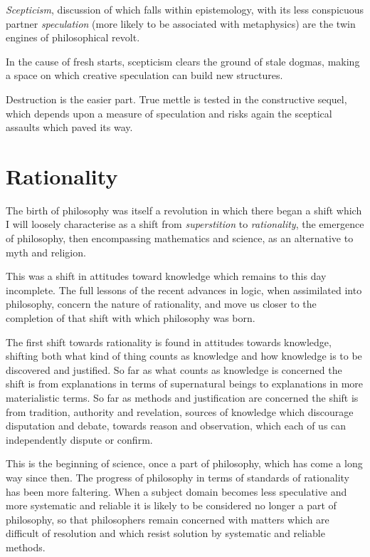 
{\it Scepticism}, discussion of which falls within epistemology, with its less conspicuous partner {\it speculation} (more likely to be associated with metaphysics)  are the twin engines of philosophical revolt.

In the cause of fresh starts, scepticism clears the ground of stale dogmas, making a space on which creative speculation can build new structures.

Destruction is the easier part.
True mettle is tested in the constructive sequel, which depends upon a measure of speculation and risks again the sceptical assaults which paved its way.

\section{Rationality}

The birth of philosophy was itself a revolution in which there began a shift which I will loosely characterise as a shift from {\it superstition} to {\it rationality}, the emergence of philosophy, then encompassing mathematics and science, as an alternative to myth and religion.

This was a shift in attitudes toward knowledge which remains to this day incomplete.
The full lessons of the recent advances in logic, when assimilated into philosophy, concern the nature of rationality, and move us closer to the completion of that shift with which philosophy was born.

The first shift towards rationality is found in attitudes towards knowledge, shifting both what kind of thing counts as knowledge and how knowledge is to be discovered and justified.
So far as what counts as knowledge is concerned the shift is from explanations in terms of supernatural beings to explanations in more materialistic terms.
So far as methods and justification are concerned the shift is from tradition, authority and revelation, sources of knowledge which discourage disputation and debate, towards reason and observation, which each of us can independently dispute or confirm.

This is the beginning of science, once a part of philosophy, which has come a long way since then.
The progress of philosophy in terms of standards of rationality has been more faltering.
When a subject domain becomes less speculative and more systematic and reliable it is likely to be considered no longer a part of philosophy, so that philosophers remain concerned with matters which are difficult of resolution and which resist solution by systematic and reliable methods.

